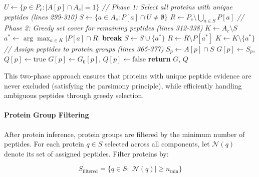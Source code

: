 \documentclass[pdflatex,sn-nature]{sn-jnl}
\begin{document}
\begin{algorithm}[H]
\begin{algorithmic}[1]
    \State $U \gets \{p \in P_c : |A[p] \cap A_c| = 1\}$ 
    \State
    \State \textit{// Phase 1: Select all proteins with unique peptides (lines 299-310)}
    \State $S \gets \{a \in A_c : P[a] \cap U \neq \emptyset\}$ 
    \State $R \gets P_c \setminus \bigcup_{a \in S} P[a]$ 
    \State
    \State \textit{// Phase 2: Greedy set cover for remaining peptides (lines 312-338)}
    \State $K \gets A_c \setminus S$ 
        \State $a^* \gets \arg\max_{a \in K} |P[a] \cap R|$ 
            \State \textbf{break} 
        \EndIf
        \State $S \gets S \cup \{a^*\}$ 
        \State $R \gets R \setminus P[a^*]$ 
        \State $K \gets K \setminus \{a^*\}$ 
    \EndWhile
    \State
    \State \textit{// Assign peptides to protein groups (lines 365-377)}
        \State $S_p \gets A[p] \cap S$ 
            \State $G[p] \gets S_p$, $Q[p] \gets \text{true}$ 
        \Else
            \State $G[p] \gets G_0[p]$, $Q[p] \gets \text{false}$ 
        \EndIf
    \EndFor
\EndFor
\State
\State \textbf{return} $G$, $Q$ 
\end{algorithmic}
\end{algorithm}

This two-phase approach ensures that proteins with unique peptide evidence are never excluded (satisfying the parsimony principle), while efficiently handling ambiguous peptides through greedy selection.

\paragraph{Protein Group Filtering} After protein inference, protein groups are filtered by the minimum number of peptides. For each protein $q \in S$ selected across all components, let $\mathcal{N}(q)$ denote its set of assigned peptides. Filter proteins by:

\begin{equation}
S_{\text{filtered}} = \{q \in S : |\mathcal{N}(q)| \geq n_{\text{min}}\}
\end{equation}
\end{document}
